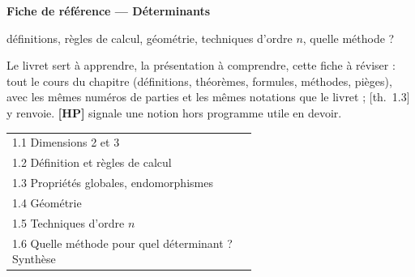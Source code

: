 \documentclass[a4paper,10pt]{article}
\newcommand{\HP}{{\sffamily\bfseries\scriptsize\textcolor{Brique}{[HP]}}}
\newcommand{\livre}[1]{{\sffamily\scriptsize\color{Gris}[#1]}}
\begin{document}
\thispagestyle{empty}
\noindent\colorbox{Bleu}{\parbox{\dimexpr\linewidth-2\fboxsep}{\vspace{0.4em}
{\color{white}\sffamily\scriptsize{}}\par\smallskip
{\color{white}\sffamily\bfseries\LARGE Fiche de référence --- Déterminants}\par\smallskip
{\color{white!85!Bleu}\sffamily définitions, règles de calcul, géométrie, techniques d'ordre $n$, quelle méthode ?}\vspace{0.4em}}}

\vspace{0.6em}
{\small Le livret sert à apprendre, la présentation à comprendre, cette fiche à réviser : tout le cours du chapitre (définitions, théorèmes, formules, méthodes, pièges), avec les mêmes numéros de parties et les mêmes notations que le livret ; \livre{th.~1.3} y renvoie. \HP{} signale une notion hors programme utile en devoir.}

\vspace{0.4em}
{\small\sffamily\noindent\begin{tabular}{@{}p{0.6\linewidth}@{}}
1.1 Dimensions 2 et 3 \dotfill\pageref{n11}\\
1.2 Définition et règles de calcul \dotfill\pageref{n12}\\
1.3 Propriétés globales, endomorphismes \dotfill\pageref{n13}\\
1.4 Géométrie \dotfill\pageref{n14}\\
1.5 Techniques d'ordre $n$ \dotfill\pageref{n16}\\
1.6 Quelle méthode pour quel déterminant ? Synthèse \dotfill\pageref{n15}\\
\end{tabular}}
\end{document}

